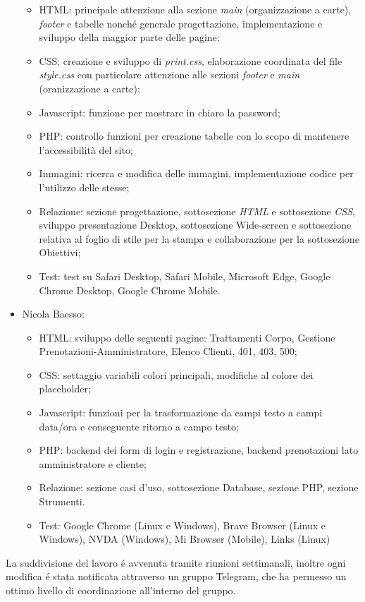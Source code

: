 \documentclass{article}
\begin{document}
\begin{itemize}
	\begin{itemize}
		\item HTML: principale attenzione alla sezione \textit{main} (organizzazione a carte), \textit{footer} e tabelle nonché generale progettazione, implementazione e sviluppo della maggior parte delle pagine;
		\item CSS: creazione e sviluppo di \textit{print.css}, elaborazione coordinata del file \textit{style.css} con particolare attenzione alle sezioni \textit{footer} e \textit{main} (oranizzazione a carte);
		\item Javascript: funzione per mostrare in chiaro la password;
		\item PHP: controllo funzioni per creazione tabelle con lo scopo di mantenere l'accessibilità del sito;
		\item Immagini: ricerca e modifica delle immagini, implementazione codice per l'utilizzo delle stesse;
		\item Relazione: sezione progettazione, sottosezione \textit{HTML} e sottosezione \textit{CSS}, sviluppo presentazione Desktop, sottosezione Wide-screen e sottosezione relativa al foglio di stile per la stampa e collaborazione per la sottosezione Obiettivi;
		\item Test: test su Safari Desktop, Safari Mobile, Microsoft Edge, Google Chrome Desktop, Google Chrome Mobile.
	\end{itemize} 
	\item Nicola Baesso:
	\begin{itemize}
		\item HTML: sviluppo delle seguenti pagine: Trattamenti Corpo, Gestione Prenotazioni-Amministratore, Elenco Clienti, 401, 403, 500;
		\item CSS: settaggio variabili colori principali, modifiche al colore dei placeholder;
		\item Javascript: funzioni per la trasformazione da campi testo a campi data/ora e conseguente ritorno a campo testo;
		\item PHP: backend dei form di login e registrazione, backend prenotazioni lato amministratore e cliente;
		\item Relazione: sezione casi d'uso, sottosezione Database, sezione PHP, sezione Strumenti.
		\item Test: Google Chrome (Linux e Windows), Brave Browser (Linux e Windows), NVDA (Windows), Mi Browser (Mobile), Links (Linux)
	\end{itemize} 
\end{itemize}
La suddivisione del lavoro é avvenuta tramite riunioni settimanali, inoltre ogni modifica é stata notificata attraverso un gruppo Telegram, che ha permesso un ottimo livello di coordinazione all'interno del gruppo.
\end{document}
